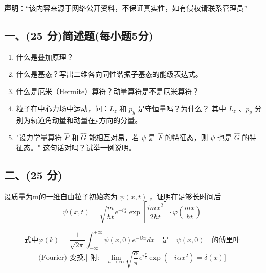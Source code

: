 
\textbf{声明}：“该内容来源于网络公开资料，不保证真实性，如有侵权请联系管理员”

\subsection{一、(25 分)简述题(每小题5分)}
\begin{enumerate}
        \item 什么是叠加原理？
        \item 什么是基态？写出二维各向同性谐振子基态的能级表达式。
        \item 什么是厄米（Hermite）算符？动量算符是不是厄米算符？
        \item 粒子在中心力场中运动，问：$L_z$ 和 $p_y$ 是守恒量吗？为什么？
        其中 $L_z$ 、$p_y$ 分别为轨道角动量和动量在y方向的分量。
        \item "设力学量算符 $\hat{F}$ 和 $\hat{G}$ 能相互对易，若 $\psi$ 是 $\hat{F}$ 的特征态，则 $\psi$ 也是 $\hat{G}$ 的特征态。" 这句话对吗？试举一例说明。
    \end{enumerate}
\subsection{二、(25 分)}
设质量为m的一维自由粒子初始态为 $\psi(x,t)$ ，证明在足够长时间后
$$\psi(x,t) = \sqrt{\frac{m}{\hbar t}} e^{-i\frac{\pi}{4}} \exp \left[ \frac{imx^2}{2\hbar t} \right] \cdot \varphi \left( \frac{mx}{\hbar t} \right)~$$

$$\text{式中}\varphi(k) = \frac{1}{\sqrt{2\pi}} \int_{-\infty}^{+\infty} \psi(x, 0) e^{-ikx} dx \quad \text{是} \quad \psi(x, 0) \quad \text{的傅里叶}~$$
$$\text{(Fourier) 变换.[ 附:} \quad \lim_{a \to \infty} \sqrt{\frac{\alpha}{\pi}} e^{i \frac{\pi}{4}} \exp(-i \alpha x^2) = \delta(x)]~$$
